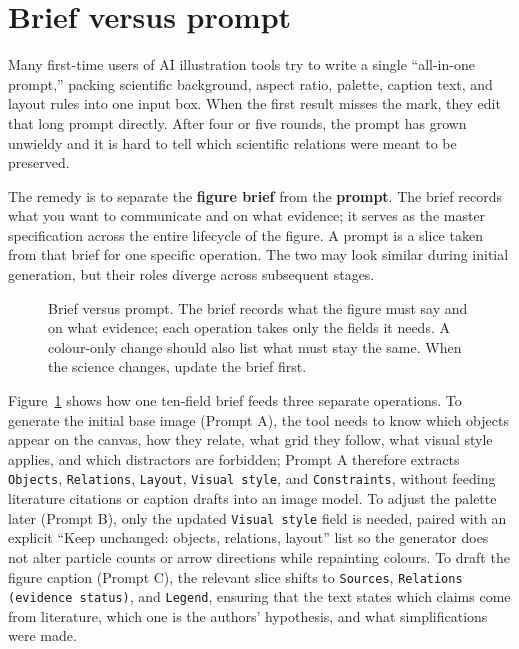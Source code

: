 \section{Brief versus prompt}

Many first-time users of AI illustration tools try to write a single ``all-in-one prompt,'' packing scientific background, aspect ratio, palette, caption text, and layout rules into one input box. When the first result misses the mark, they edit that long prompt directly. After four or five rounds, the prompt has grown unwieldy and it is hard to tell which scientific relations were meant to be preserved.

The remedy is to separate the \textbf{figure brief} from the \textbf{prompt}. The brief records what you want to communicate and on what evidence; it serves as the master specification across the entire lifecycle of the figure. A prompt is a slice taken from that brief for one specific operation. The two may look similar during initial generation, but their roles diverge across subsequent stages.

\begin{figure}[htbp]\centering

\caption{Brief versus prompt. The brief records what the figure must say and on what evidence; each operation takes only the fields it needs. A colour-only change should also list what must stay the same. When the science changes, update the brief first.}\label{fig:ch02-01}
\end{figure}

Figure~\ref{fig:ch02-01} shows how one ten-field brief feeds three separate operations. To generate the initial base image (Prompt A), the tool needs to know which objects appear on the canvas, how they relate, what grid they follow, what visual style applies, and which distractors are forbidden; Prompt A therefore extracts \texttt{Objects}, \texttt{Relations}, \texttt{Layout}, \texttt{Visual style}, and \texttt{Constraints}, without feeding literature citations or caption drafts into an image model. To adjust the palette later (Prompt B), only the updated \texttt{Visual style} field is needed, paired with an explicit ``Keep unchanged: objects, relations, layout'' list so the generator does not alter particle counts or arrow directions while repainting colours. To draft the figure caption (Prompt C), the relevant slice shifts to \texttt{Sources}, \texttt{Relations (evidence status)}, and \texttt{Legend}, ensuring that the text states which claims come from literature, which one is the authors' hypothesis, and what simplifications were made.

